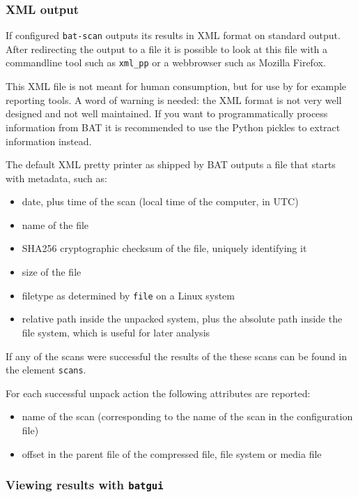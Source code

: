 \documentclass[10pt]{article}
\begin{document}
\subsubsection{XML output}

If configured \texttt{bat-scan} outputs its results in XML format on
standard output. After redirecting the output to a file it is possible to look
at this file with a commandline tool such as \texttt{xml\_pp} or a webbrowser
such as Mozilla Firefox.

This XML file is not meant for human consumption, but for use by for example
reporting tools. A word of warning is needed: the XML format is not very well
designed and not well maintained. If you want to programmatically process
information from BAT it is recommended to use the Python pickles to extract
information instead.

The default XML pretty printer as shipped by BAT outputs a file that starts
with metadata, such as:

\begin{itemize}
\item date, plus time of the scan (local time of the computer, in UTC)
\item name of the file
\item SHA256 cryptographic checksum of the file, uniquely identifying it
\item size of the file
\item filetype as determined by \texttt{file} on a Linux system
\item relative path inside the unpacked system, plus the absolute path inside
the file system, which is useful for later analysis
\end{itemize}

If any of the scans were successful the results of the these scans can
be found in the element \texttt{scans}.

For each successful unpack action the following attributes are reported:

\begin{itemize}
\item name of the scan (corresponding to the name of the scan in the
configuration file)
\item offset in the parent file of the compressed file, file system or media
file
\end{itemize}

\subsubsection{Viewing results with \texttt{batgui}}
\end{document}
